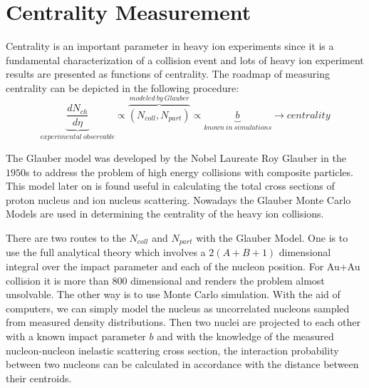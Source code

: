 \documentclass[11pt]{article} %
\begin{document}

\section{Centrality Measurement}

Centrality is an important parameter in heavy ion experiments since it is a fundamental characterization of a collision event and lots of heavy ion experiment results are presented as functions of centrality. The roadmap of measuring centrality can be depicted in the following procedure:
\begin{equation}
\underbrace{\frac{dN_{ch}}{d\eta}}_{experimental \: observable} \propto \overbrace{\left( N_{coll}, N_{part} \right)}^{modeled\:by\:Glauber} \propto \underbrace{b}_{known\:in\:simulations}\rightarrow centrality
\end{equation}

The Glauber model \cite{miller07} was developed by the Nobel Laureate Roy Glauber in the $1950$s to address the problem of high energy collisions with composite particles. This model later on is found useful in calculating the total cross sections of proton nucleus and ion nucleus scattering. Nowadays the Glauber Monte Carlo Models are used in determining the centrality of the heavy ion collisions.

There are two routes to the $N_{coll}$ and ${N_{part}}$ with the Glauber Model. One is to use the full analytical theory which involves a $2(A+B+1)$ dimensional integral over the impact parameter and each of the nucleon position. For Au+Au collision it is more than 800 dimensional and renders the problem almost unsolvable. The other way is to use Monte Carlo simulation. With the aid of computers, we can simply model the nucleus as uncorrelated nucleons sampled from measured density distributions. Then two nuclei are projected to each other with a known impact parameter $b$ and with the knowledge of the measured nucleon-nucleon inelastic scattering cross section, the interaction probability between two nucleons can be calculated in accordance with the distance between their centroids.
\end{document}
